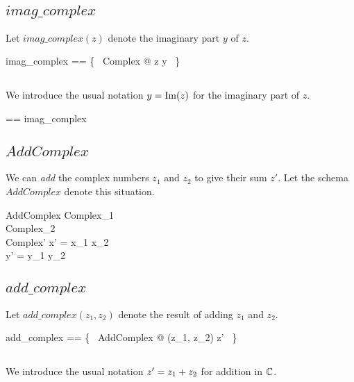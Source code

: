 \documentclass[11pt, oneside]{article}
\begin{document}
\subsection{$imag\_complex$}

Let $imag\_complex(z)$ denote the imaginary part $y$ of $z$.

\begin{zed}
	imag\_complex == \{~ Complex @ z \mapsto y ~\}
\end{zed}

\subsection{}

We introduce the usual notation $y = \operatorname{Im}(z)$ for the imaginary part of $z$.

\begin{zed}
	\imagC == imag\_complex
\end{zed}

\subsection{$AddComplex$}

We can \textit{add} the complex numbers $z_1$ and $z_2$ to give their sum $z'$.
Let the schema $AddComplex$ denote this situation.

\begin{schema}{AddComplex}
	Complex_1 \\
	Complex_2 \\
	Complex'
\where
	x' = x_1 \addR x_2 \\
	y' = y_1 \addR y_2
\end{schema}

\subsection{$add\_complex$}

Let $add\_complex(z_1, z_2)$ denote the result of adding $z_1$ and $z_2$.

\begin{zed}
	add\_complex == \{~ AddComplex @ (z_1, z_2) \mapsto z' ~\}
\end{zed}

\subsection{}

We introduce the usual notation $z' = z_1 \mathbin{+} z_2$ for addition in $\mathbb{C}$.
\end{document}
